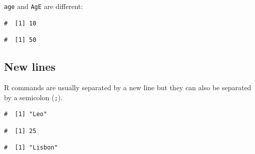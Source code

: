 \documentclass[a4paper,9pt,twocolumn,twoside,printwatermark=false]{pinp}
\begin{document}
\texttt{age} and \texttt{AgE} are different:

\begin{Shaded}
\begin{Highlighting}[]
\StringTok{ }
\StringTok{ }
\end{Highlighting}
\end{Shaded}

\begin{Shaded}
\begin{Highlighting}[]
\end{Highlighting}
\end{Shaded}

\begin{ShadedResult}
\begin{verbatim}
#  [1] 10
\end{verbatim}
\end{ShadedResult}

\begin{Shaded}
\begin{Highlighting}[]
\end{Highlighting}
\end{Shaded}

\begin{ShadedResult}
\begin{verbatim}
#  [1] 50
\end{verbatim}
\end{ShadedResult}

\subsection{New lines}\label{new-lines}

R commands are usually separated by a new line but they can also be
separated by a semicolon (\texttt{;}).

\begin{Shaded}
\begin{Highlighting}[]
\StringTok{ }
\end{Highlighting}
\end{Shaded}

\begin{ShadedResult}
\begin{verbatim}
#  [1] "Leo"
\end{verbatim}
\end{ShadedResult}\begin{ShadedResult}
\begin{verbatim}
#  [1] 25
\end{verbatim}
\end{ShadedResult}\begin{ShadedResult}
\begin{verbatim}
#  [1] "Lisbon"
\end{verbatim}
\end{ShadedResult}
\end{document}
